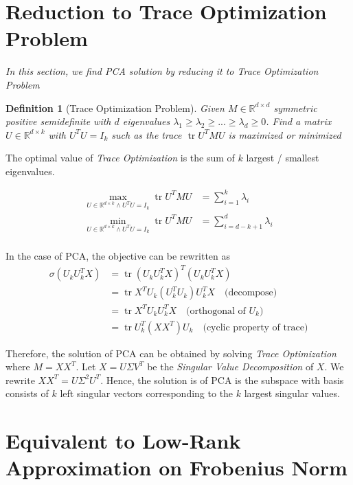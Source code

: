 \documentclass{article}
\DeclareMathOperator{\tr}{tr}
\newtheorem{definition}{Definition}
\begin{document}
\section{Reduction to Trace Optimization Problem}

\emph{In this section, we find PCA solution by reducing it to Trace Optimization Problem}

\begin{definition}[Trace Optimization Problem]
    Given $M \in \mathbb{R}^{d \times d}$ symmetric positive semidefinite with $d$ eigenvalues $\lambda_1  \geq \lambda_2 \geq ... \geq \lambda_d \geq 0$. Find a matrix $U \in \mathbb{R}^{d \times k}$ with $U^T U = I_k$ such as the trace $\tr U^T M U$ is maximized or minimized
\end{definition}

The optimal value of \emph{Trace Optimization} is the sum of $k$ largest / smallest eigenvalues.

\begin{align*}
    \max_{U \in \mathbb{R}^{d \times k} \land U^T U = I_k} \tr U^T M U &= \sum_{i=1}^k \lambda_i \\
    \min_{U \in \mathbb{R}^{d \times k} \land U^T U = I_k} \tr U^T M U &= \sum_{i=d-k+1}^d \lambda_i \\
\end{align*}

In the case of PCA, the objective can be rewritten as
\begin{equation}
\begin{split}
    \sigma(U_k U_k^T X)    &= \tr (U_k U_k^T X)^T (U_k U_k^T X)  \\
                        &= \tr X^T U_k (U_k^T U_k) U_k^T X \quad \text{(decompose)} \\
                        &= \tr X^T U_k U_k^T X \quad \text{(orthogonal of $U_k$)} \\
                        &= \tr U_k^T (X X^T) U_k \quad \text{(cyclic property of trace)}
\end{split}
\end{equation}

Therefore, the solution of PCA can be obtained by solving \emph{Trace Optimization} where $M = XX^T$. Let $X = U \Sigma V^T$ be the \emph{Singular Value Decomposition} of $X$. We rewrite $XX^T = U \Sigma^2 U^T$. Hence, the solution is of PCA is the subspace with basis consists of $k$ left singular vectors corresponding to the $k$ largest singular values.

\section{Equivalent to Low-Rank Approximation on Frobenius Norm}
\end{document}
